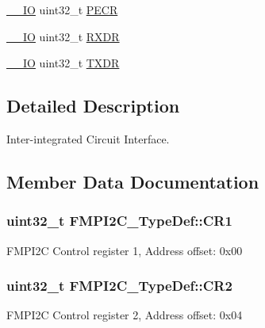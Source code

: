 \begin{DoxyCompactItemize}
\item 
\hyperlink{core__sc300_8h_aec43007d9998a0a0e01faede4133d6be}{\+\_\+\+\_\+\+IO} uint32\+\_\+t \hyperlink{struct_f_m_p_i2_c___type_def_a51b237eef8aba0ac4738ff2f39f109c5}{P\+E\+CR}
\item 
\hyperlink{core__sc300_8h_aec43007d9998a0a0e01faede4133d6be}{\+\_\+\+\_\+\+IO} uint32\+\_\+t \hyperlink{struct_f_m_p_i2_c___type_def_a559de98a04feb3ea2b4770f1f7fab3f5}{R\+X\+DR}
\item 
\hyperlink{core__sc300_8h_aec43007d9998a0a0e01faede4133d6be}{\+\_\+\+\_\+\+IO} uint32\+\_\+t \hyperlink{struct_f_m_p_i2_c___type_def_a9d79189764dcb9a54fed33b6b1b5a256}{T\+X\+DR}
\end{DoxyCompactItemize}


\subsection{Detailed Description}
Inter-\/integrated Circuit Interface. 

\subsection{Member Data Documentation}
\subsubsection[{\texorpdfstring{C\+R1}{CR1}}]{ uint32\+\_\+t F\+M\+P\+I2\+C\+\_\+\+Type\+Def\+::\+C\+R1}\hypertarget{struct_f_m_p_i2_c___type_def_a68e7df34b14feaacd9d8a65d94bef8cd}{}\label{struct_f_m_p_i2_c___type_def_a68e7df34b14feaacd9d8a65d94bef8cd}
F\+M\+P\+I2C Control register 1, Address offset\+: 0x00 
\subsubsection[{\texorpdfstring{C\+R2}{CR2}}]{ uint32\+\_\+t F\+M\+P\+I2\+C\+\_\+\+Type\+Def\+::\+C\+R2}\hypertarget{struct_f_m_p_i2_c___type_def_ab0699c00e17f4a1abfbed45e2f393612}{}\label{struct_f_m_p_i2_c___type_def_ab0699c00e17f4a1abfbed45e2f393612}
F\+M\+P\+I2C Control register 2, Address offset\+: 0x04 
